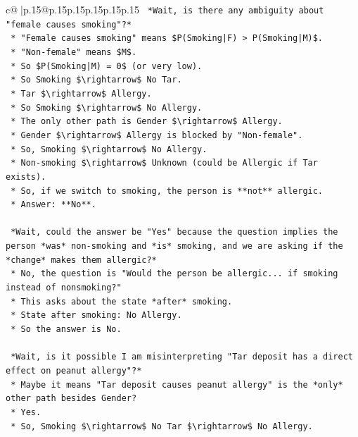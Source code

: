 \documentclass{article}
\begin{document}
{\begin{supertabular}{c@{$\;$}|p{.15\linewidth}@{}p{.15\linewidth}p{.15\linewidth}p{.15\linewidth}p{.15\linewidth}p{.15\linewidth}}
{{{\texttt{    *Wait, is there any ambiguity about "female causes smoking"?*} \\
\texttt{    *   "Female causes smoking" means \$P(Smoking|F) > P(Smoking|M)\$.} \\
\texttt{    *   "Non{-}female" means \$M\$.} \\
\texttt{    *   So \$P(Smoking|M) = 0\$ (or very low).} \\
\texttt{    *   So Smoking \$\textbackslash{}rightarrow\$ No Tar.} \\
\texttt{    *   Tar \$\textbackslash{}rightarrow\$ Allergy.} \\
\texttt{    *   So Smoking \$\textbackslash{}rightarrow\$ No Allergy.} \\
\texttt{    *   The only other path is Gender \$\textbackslash{}rightarrow\$ Allergy.} \\
\texttt{    *   Gender \$\textbackslash{}rightarrow\$ Allergy is blocked by "Non{-}female".} \\
\texttt{    *   So, Smoking \$\textbackslash{}rightarrow\$ No Allergy.} \\
\texttt{    *   Non{-}smoking \$\textbackslash{}rightarrow\$ Unknown (could be Allergic if Tar exists).} \\
\texttt{    *   So, if we switch to smoking, the person is **not** allergic.} \\
\texttt{    *   Answer: **No**.} \\
\\ 
\texttt{    *Wait, could the answer be "Yes" because the question implies the person *was* non{-}smoking and *is* smoking, and we are asking if the *change* makes them allergic?*} \\
\texttt{    *   No, the question is "Would the person be allergic... if smoking instead of nonsmoking?"} \\
\texttt{    *   This asks about the state *after* smoking.} \\
\texttt{    *   State after smoking: No Allergy.} \\
\texttt{    *   So the answer is No.} \\
\\ 
\texttt{    *Wait, is it possible I am misinterpreting "Tar deposit has a direct effect on peanut allergy"?*} \\
\texttt{    *   Maybe it means "Tar deposit causes peanut allergy" is the *only* other path besides Gender?} \\
\texttt{    *   Yes.} \\
\texttt{    *   So, Smoking \$\textbackslash{}rightarrow\$ No Tar \$\textbackslash{}rightarrow\$ No Allergy.} \\
}}}
\end{supertabular}}
\end{document}
